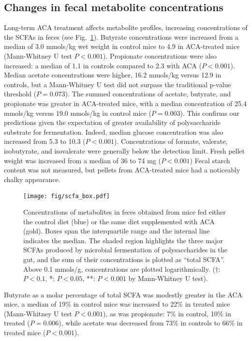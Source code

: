 \documentclass{doc/template/bmcart-nofigbox}
\begin{document}
\subsection*{Changes in fecal metabolite concentrations}

Long-term ACA treatment affects metabolite profiles, increasing
concentrations of the SCFAs in feces (see Fig.~\ref{fig:scfa_box}).
Butyrate concentrations were increased
from a median of 3.0 mmols/kg wet weight in control mice to 4.9 in ACA-treated
mice (Mann-Whitney U test $P < 0.001$).
Propionate concentrations were also increased: a median of 1.1 in controls
compared to 2.3 with ACA ($P < 0.001$).
Median acetate concentrations were higher, 16.2 mmols/kg versus 12.9 in
controls, but a Mann-Whitney U test did not surpass the traditional
p-value threshold ($P = 0.073$).
The summed concentrations of acetate, butyrate, and propionate
was greater in ACA-treated mice, with a median concentration of 25.4 mmols/kg
versus 19.0 mmols/kg in control mice ($P = 0.003$).
This confirms our predictions given the expectation of greater
availability of polysaccharide substrate for fermentation.
Indeed, median glucose concentration was also increased from 5.3 to 10.3
($P < 0.001$).
Concentrations of formate, valerate, isobutyrate, and isovalerate
were generally below the detection limit.
Fresh pellet weight was increased from a median of 36 to 74 mg ($P < 0.001$)
Fecal starch content was not measured,
but pellets from ACA-treated mice had a noticeably chalky appearance.

\begin{figure}[h!]
  \texttt{[image: fig/scfa\_box.pdf]}
  \caption{\label{fig:scfa_box}
  Concentrations of metabolites in feces obtained from mice fed either the
  control diet (blue)
  or the same diet supplemented with ACA (gold).
  Boxes span the interquartile range and the internal line indicates the
  median.
  The shaded region highlights the three major SCFAs produced by
  microbial fermentation of polysaccharides in the gut, and the sum of their
  concentrations is plotted as ``total SCFA''.
  Above 0.1 mmols/g, concentrations are plotted logarithmically.
  (†: $P < 0.1$, *: $P < 0.05$,
  **: $P < 0.001$ by Mann-Whitney U test).
  }
\end{figure}

Butyrate as a molar percentage of total SCFA was modestly greater in the ACA
mice, a median of 19\% in control mice was increased to 22\% in treated mice
(Mann-Whitney U test $P < 0.001$),
as was propionate: 7\% in control, 10\% in treated ($P = 0.006$),
while acetate was decreased
from 73\% in controls to 66\% in treated mice ($P < 0.001$).
\end{document}
